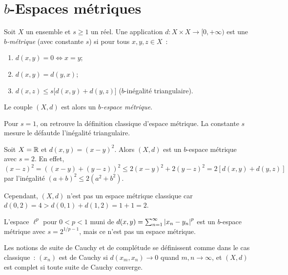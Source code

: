 \section{$b$-Espaces m\'etriques}

\begin{definition}
Soit $X$ un ensemble et $s \geq 1$ un r\'eel. Une application
$d : X \times X \to [0, +\infty)$ est une \emph{$b$-m\'etrique} (avec constante $s$)
si pour tous $x, y, z \in X$~:
\begin{enumerate}
    \item $d(x, y) = 0 \Leftrightarrow x = y$;
    \item $d(x, y) = d(y, x)$;
    \item $d(x, z) \leq s \bigl[ d(x, y) + d(y, z) \bigr]$ \quad ($b$-in\'egalit\'e triangulaire).
\end{enumerate}
Le couple $(X, d)$ est alors un \emph{$b$-espace m\'etrique}.
\end{definition}

\begin{remarque}
Pour $s = 1$, on retrouve la d\'efinition classique d'espace m\'etrique. La
constante $s$ mesure le \og{}d\'efaut\fg de l'in\'egalit\'e triangulaire.
\end{remarque}

\begin{exemple}
Soit $X = \mathbb{R}$ et $d(x, y) = (x - y)^2$. Alors $(X, d)$ est un $b$-espace
m\'etrique avec $s = 2$. En effet, $(x - z)^2 = ((x-y) + (y-z))^2 \leq
2(x-y)^2 + 2(y-z)^2 = 2[d(x,y) + d(y,z)]$ par l'in\'egalit\'e
$(a + b)^2 \leq 2(a^2 + b^2)$.

Cependant, $(X, d)$ n'est pas un espace m\'etrique classique car
$d(0, 2) = 4 > d(0, 1) + d(1, 2) = 1 + 1 = 2$.
\end{exemple}

\begin{exemple}
L'espace $\ell^p$ pour $0 < p < 1$ muni de $d(x, y) = \sum_{n=1}^\infty
\left| x_n - y_n \right|^p$ est un $b$-espace m\'etrique avec $s = 2^{1/p - 1}$,
mais ce n'est pas un espace m\'etrique.
\end{exemple}

\begin{definition}
Les notions de suite de Cauchy et de compl\'etude se d\'efinissent comme dans
le cas classique~: $(x_n)$ est de Cauchy si $d(x_m, x_n) \to 0$ quand
$m, n \to \infty$, et $(X, d)$ est complet si toute suite de Cauchy converge.
\end{definition}

